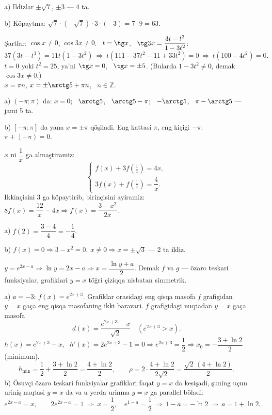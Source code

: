 a) Ildizlar $\pm\sqrt7$, $\pm3$ — 4 ta.

b) Köpaytma: $\sqrt7\cdot(-\sqrt7)\cdot3\cdot(-3)=7\cdot9=63$.

\newpage
{}
Şartlar: $\cos x\ne0$, $\cos3x\ne0$. \ $t=\tg x$, \ $\tg3x=\dfrac{3t-t^3}{1-3t^2}$:
\[37\left(3t-t^3\right)=11t\left(1-3t^2\right)\ \Rightarrow\ t\left(111-37t^2-11+33t^2\right)=0\ \Rightarrow\ t\left(100-4t^2\right)=0.\]
$t=0$ yoki $t^2=25$, ya'ni $\tg x=0$, \ $\tg x=\pm5$. (Bularda $1-3t^2\ne0$, demak $\cos3x\ne0$.)\\
$x=\pi n$, \quad $x=\pm\arctg5+\pi n$, \ $n\in\mathbb Z$.

a) $(-\pi;\pi)$ da: $x=0$; \ $\arctg5$, \ $\arctg5-\pi$; \ $-\arctg5$, \ $\pi-\arctg5$ — jami 5 ta.

b) $[-\pi;\pi]$ da yana $x=\pm\pi$ qöşiladi. Eng kattasi $\pi$, eng kiçigi $-\pi$: \ $\pi+(-\pi)=0$.

\newpage
{}
$x$ ni $\dfrac1x$ ga almaştiramiz:
\[\begin{cases}f(x)+3f\left(\frac1x\right)=4x,\\[2pt] 3f(x)+f\left(\frac1x\right)=\dfrac4x.\end{cases}\]
Ikkinçisini 3 ga köpaytirib, birinçisini ayiramiz: $8f(x)=\dfrac{12}x-4x\Rightarrow f(x)=\dfrac{3-x^2}{2x}$.

a) $f(2)=\dfrac{3-4}{4}=-\dfrac14$.

b) $f(x)=0\Rightarrow 3-x^2=0,\ x\ne0\Rightarrow x=\pm\sqrt3$ — 2 ta ildiz.

\newpage
{}
$y=e^{2x-a}\Rightarrow \ln y=2x-a\Rightarrow x=\dfrac{\ln y+a}2$. Demak $f$ va $g$ — özaro teskari funksiyalar, grafiklari $y=x$ töğri çiziqqa nisbatan simmetrik.

a) $a=-3$: $f(x)=e^{2x+3}$. Grafiklar orasidagi eng qisqa masofa $f$ grafigidan $y=x$ gaça eng qisqa masofaning ikki baravari. $f$ grafigidagi nuqtadan $y=x$ gaça masofa
\[d(x)=\frac{e^{2x+3}-x}{\sqrt2}\quad(e^{2x+3}>x).\]
$h(x)=e^{2x+3}-x$, \ $h'(x)=2e^{2x+3}-1=0\Rightarrow e^{2x+3}=\dfrac12\Rightarrow x_0=-\dfrac{3+\ln2}2$ (minimum).
\[h_{\min}=\frac12+\frac{3+\ln2}2=\frac{4+\ln2}2,\qquad \rho=2\cdot\frac{4+\ln2}{2\sqrt2}=\frac{\sqrt2\,(4+\ln2)}2.\]
b) Ösuvçi özaro teskari funksiyalar grafiklari faqat $y=x$ da kesişadi, şuning uçun uriniş nuqtasi $y=x$ da va u yerda urinma $y=x$ ga parallel böladi:
\[e^{2x-a}=x,\qquad 2e^{2x-a}=1\ \Rightarrow\ x=\frac12,\quad e^{1-a}=\frac12\ \Rightarrow\ 1-a=-\ln2\ \Rightarrow\ a=1+\ln2.\]

